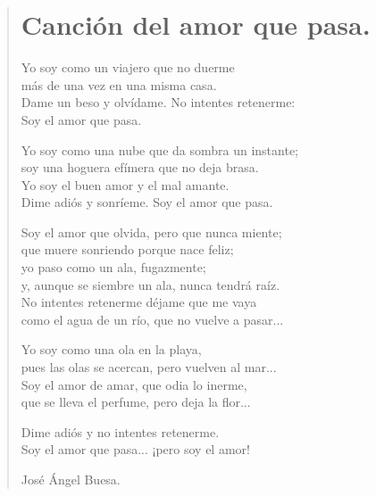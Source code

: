 \documentclass[11pt, portrait, twoside, notitlepage, openright]{book}
\begin{document}
\newpage
\begin{verse}
\begin{center}
\section{Canción del amor que pasa.}
\end{center}
Yo soy como un viajero que no duerme\\
más de una vez en una misma casa.\\
Dame un beso y olvídame. No intentes retenerme:\\
Soy el amor que pasa.
\newline

Yo soy como una nube que da sombra un instante;\\
soy una hoguera efímera que no deja brasa.\\
Yo soy el buen amor y el mal amante.\\
Dime adiós y sonríeme. Soy el amor que pasa.
\newline

Soy el amor que olvida, pero que nunca miente;\\
que muere sonriendo porque nace feliz;\\
yo paso como un ala, fugazmente;\\
y, aunque se siembre un ala, nunca tendrá raíz.\\
No intentes retenerme déjame que me vaya\\
como el agua de un río, que no vuelve a pasar...
\newpage

Yo soy como una ola en la playa,\\
pues las olas se acercan, pero vuelven al mar...\\
Soy el amor de amar, que odia lo inerme,\\
que se lleva el perfume, pero deja la flor...
\newline

Dime adiós y no intentes retenerme.\\
Soy el amor que pasa... ¡pero soy el amor!
\newline

José Ángel Buesa.
\end{verse}
\end{document}
